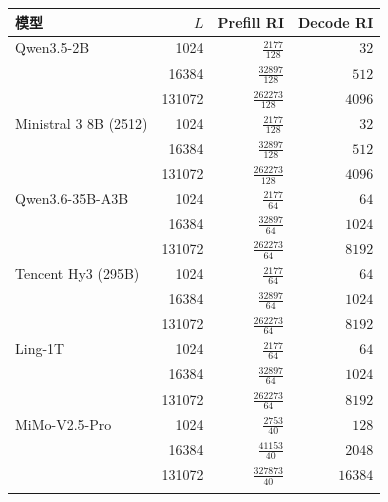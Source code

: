 \begin{tabular}{@{}lrrr@{}}\toprule
模型 & $L$ & Prefill RI & Decode RI\\\midrule
Qwen3.5-2B & 1024 & $\frac{2177}{128}$ & $32$\\[5pt]
 & 16384 & $\frac{32897}{128}$ & $512$\\[5pt]
 & 131072 & $\frac{262273}{128}$ & $4096$\\[5pt]
\addlinespace[2pt]
Ministral 3 8B (2512) & 1024 & $\frac{2177}{128}$ & $32$\\[5pt]
 & 16384 & $\frac{32897}{128}$ & $512$\\[5pt]
 & 131072 & $\frac{262273}{128}$ & $4096$\\[5pt]
\addlinespace[2pt]
Qwen3.6-35B-A3B & 1024 & $\frac{2177}{64}$ & $64$\\[5pt]
 & 16384 & $\frac{32897}{64}$ & $1024$\\[5pt]
 & 131072 & $\frac{262273}{64}$ & $8192$\\[5pt]
\addlinespace[2pt]
Tencent Hy3 (295B) & 1024 & $\frac{2177}{64}$ & $64$\\[5pt]
 & 16384 & $\frac{32897}{64}$ & $1024$\\[5pt]
 & 131072 & $\frac{262273}{64}$ & $8192$\\[5pt]
\addlinespace[2pt]
Ling-1T & 1024 & $\frac{2177}{64}$ & $64$\\[5pt]
 & 16384 & $\frac{32897}{64}$ & $1024$\\[5pt]
 & 131072 & $\frac{262273}{64}$ & $8192$\\[5pt]
\addlinespace[2pt]
MiMo-V2.5-Pro & 1024 & $\frac{2753}{40}$ & $128$\\[5pt]
 & 16384 & $\frac{41153}{40}$ & $2048$\\[5pt]
 & 131072 & $\frac{327873}{40}$ & $16384$\\[5pt]
\addlinespace[2pt]
\bottomrule\end{tabular}
